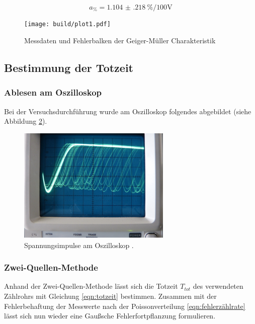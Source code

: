 \begin{flushleft}
\begin{equation}
a_{\si{\percent}} = \SI{1.104(218)}{\percent\per{100}\volt}
\end{equation}

%

\end{flushleft}
\begin{figure}[h]
  \centering
  \texttt{[image: build/plot1.pdf]}
  \caption{Messdaten und Fehlerbalken der Geiger-Müller Charakteristik}
  \label{fig:plot1}
\end{figure}

\subsection{Bestimmung der Totzeit}

\subsubsection{Ablesen am Oszilloskop}
Bei der Versuchsdurchführung wurde am Oszilloskop folgendes abgebildet (siehe Abbildung \ref{fig:abb4}).

\begin{figure}[h]
  \centering
  \includegraphics[width=0.65\textwidth]{bilder/Abbildung4.png}
  \caption{Spannungsimpulse am Oszilloskop \cite{ap031}.}
  \label{fig:abb4}
\end{figure}


\subsubsection{Zwei-Quellen-Methode}
Anhand der Zwei-Quellen-Methode lässt sich die Totzeit $T_{tot}$ des verwendeten Zählrohrs mit Gleichung \eqref{eqn:totzeit} bestimmen.
Zusammen mit der Fehlerbehaftung der Messwerte nach der Poissonverteilung \eqref{eqn:fehlerzählrate} lässt sich nun wieder eine
Gaußsche Fehlerfortpflanzung formulieren.

